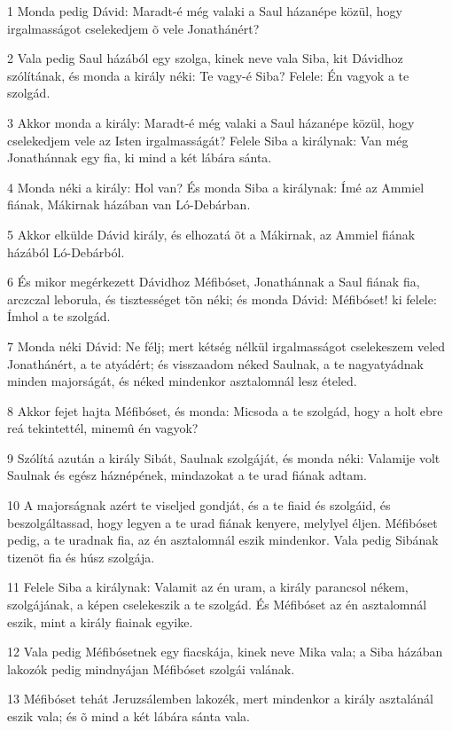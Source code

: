 \par 1 Monda pedig Dávid: Maradt-é még valaki a Saul házanépe közül, hogy irgalmasságot cselekedjem õ  vele Jonathánért?
\par 2 Vala pedig Saul házából egy szolga, kinek neve vala Siba, kit Dávidhoz szólítának, és monda a király néki: Te vagy-é Siba? Felele: Én vagyok a te szolgád.
\par 3 Akkor monda a király: Maradt-é még valaki a Saul házanépe közül, hogy cselekedjem vele az Isten irgalmasságát? Felele Siba a királynak: Van még Jonathánnak egy fia, ki mind a  két lábára sánta.
\par 4 Monda néki a király: Hol van? És monda Siba a királynak: Ímé az Ammiel fiának, Mákirnak házában van Ló-Debárban.
\par 5 Akkor elkülde Dávid király, és elhozatá õt a Mákirnak, az Ammiel fiának házából Ló-Debárból.
\par 6 És mikor megérkezett Dávidhoz Méfibóset, Jonathánnak a Saul fiának fia, arczczal leborula, és tisztességet tõn néki; és monda Dávid: Méfibóset! ki felele: Ímhol a te szolgád.
\par 7 Monda néki Dávid: Ne félj; mert kétség nélkül irgalmasságot cselekeszem veled Jonathánért, a te atyádért; és visszaadom néked Saulnak, a te nagyatyádnak minden majorságát, és néked mindenkor asztalomnál lesz ételed.
\par 8 Akkor fejet hajta Méfibóset, és monda: Micsoda a te szolgád, hogy a holt ebre reá tekintettél, minemû én vagyok?
\par 9 Szólítá azután a király Sibát, Saulnak szolgáját, és monda néki: Valamije volt Saulnak és egész háznépének, mindazokat a te urad fiának adtam.
\par 10 A majorságnak azért te viseljed gondját, és a te fiaid és szolgáid, és beszolgáltassad, hogy legyen a te urad fiának kenyere, melylyel éljen. Méfibóset pedig, a te uradnak fia, az én asztalomnál eszik mindenkor. Vala pedig Sibának tizenöt fia és húsz szolgája.
\par 11 Felele Siba a királynak: Valamit az én uram, a király parancsol nékem, szolgájának, a képen cselekeszik a te szolgád. És Méfibóset az én asztalomnál eszik, mint a király fiainak egyike.
\par 12 Vala pedig Méfibósetnek egy fiacskája, kinek neve Mika vala; a Siba házában lakozók pedig mindnyájan Méfibóset szolgái valának.
\par 13 Méfibóset tehát Jeruzsálemben lakozék, mert mindenkor a király asztalánál eszik vala; és õ mind a két lábára sánta vala.

